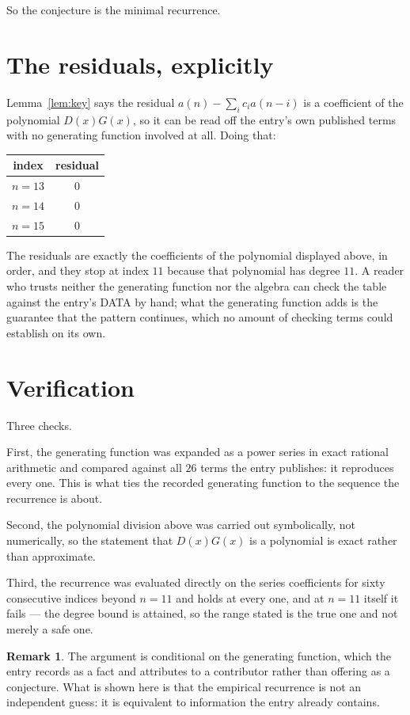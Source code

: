 \documentclass[11pt,a4paper]{article}
\theoremstyle{plain}
\theoremstyle{definition}
\newtheorem{remark}[theorem]{Remark}
\begin{document}
So the conjecture is the minimal recurrence.

\section{The residuals, explicitly}

Lemma~\ref{lem:key} says the residual $a(n)-\sum_ic_ia(n-i)$ is a coefficient of the
polynomial $D(x)G(x)$, so it can be read off the entry's own published terms with no
generating function involved at all. Doing that:
\begin{center}
\begin{tabular}{cc}
index & residual \\ \hline
$n=13$ & $0$ \\
$n=14$ & $0$ \\
$n=15$ & $0$
\end{tabular}
\end{center}
The residuals are exactly the coefficients of the polynomial displayed above, in order, and
they stop at index $11$ because that polynomial has degree $11$. A reader who trusts
neither the generating function nor the algebra can check the table against the entry's DATA
by hand; what the generating function adds is the guarantee that the pattern continues, which
no amount of checking terms could establish on its own.

\section{Verification}

Three checks.

First, the generating function was expanded as a power series in exact rational arithmetic and
compared against all $26$ terms the entry publishes: it reproduces every one. This is
what ties the recorded generating function to the sequence the recurrence is about.

Second, the polynomial division above was carried out symbolically, not numerically, so the
statement that $D(x)G(x)$ is a polynomial is exact rather than approximate.

Third, the recurrence was evaluated directly on the series coefficients for sixty consecutive
indices beyond $n=11$ and holds at every one, and at $n=11$ itself it fails --- the
degree bound is attained, so the range stated is the true one and not merely a safe one.

\begin{remark}
The argument is conditional on the generating function, which the entry records as a fact and
attributes to a contributor rather than offering as a conjecture. What is shown here is that
the empirical recurrence is not an independent guess: it is equivalent to information the
entry already contains.
\end{remark}
\end{document}

